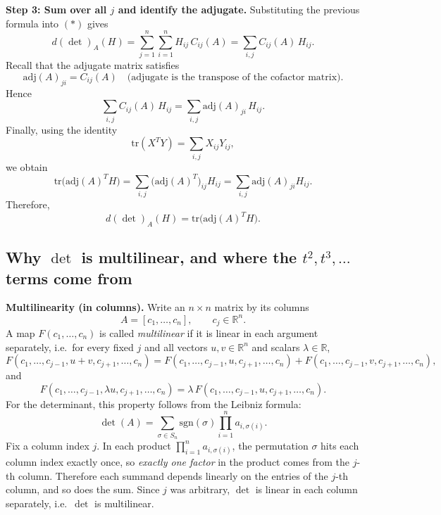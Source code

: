 \documentclass[12pt,a4paper]{article}
\theoremstyle{plain}
\theoremstyle{definition}      %
\begin{document}
	\medskip
	\noindent\textbf{Step 3: Sum over all $j$ and identify the adjugate.}
	Substituting the previous formula into $(\ast)$ gives
	\[
	d(\det)_A(H)=\sum_{j=1}^n\sum_{i=1}^n H_{ij}\,C_{ij}(A)
	=\sum_{i,j} C_{ij}(A)\,H_{ij}.
	\]
	Recall that the adjugate matrix satisfies
	\[
	\mathrm{adj}(A)_{ji}=C_{ij}(A)
	\quad\text{(adjugate is the transpose of the cofactor matrix).}
	\]
	Hence
	\[
	\sum_{i,j} C_{ij}(A)\,H_{ij}
	=\sum_{i,j} \mathrm{adj}(A)_{ji}\,H_{ij}.
	\]
	Finally, using the identity
	\[
	\mathrm{tr}(X^T Y)=\sum_{i,j} X_{ij}Y_{ij},
	\]
	we obtain
	\[
	\mathrm{tr}\big(\mathrm{adj}(A)^T H\big)
	=\sum_{i,j} \big(\mathrm{adj}(A)^T\big)_{ij}H_{ij}
	=\sum_{i,j} \mathrm{adj}(A)_{ji}H_{ij}.
	\]
	Therefore,
	\[
	d(\det)_A(H)=\mathrm{tr}\big(\mathrm{adj}(A)^T H\big).
	\]
	
	\subsection*{Why $\det$ is multilinear, and where the $t^2,t^3,\dots$ terms come from}
	
	\noindent\textbf{Multilinearity (in columns).}
	Write an $n\times n$ matrix by its columns
	\[
	A=[c_1,\dots,c_n],\qquad c_j\in\mathbb{R}^n.
	\]
	A map $F(c_1,\dots,c_n)$ is called \emph{multilinear} if it is linear in each argument separately, i.e.\ for every
	fixed $j$ and all vectors $u,v\in\mathbb{R}^n$ and scalars $\lambda\in\mathbb{R}$,
	\[
	F(c_1,\dots,c_{j-1},u+v,c_{j+1},\dots,c_n)
	=
	F(c_1,\dots,c_{j-1},u,c_{j+1},\dots,c_n)
	+
	F(c_1,\dots,c_{j-1},v,c_{j+1},\dots,c_n),
	\]
	and
	\[
	F(c_1,\dots,c_{j-1},\lambda u,c_{j+1},\dots,c_n)
	=
	\lambda\,F(c_1,\dots,c_{j-1},u,c_{j+1},\dots,c_n).
	\]
	For the determinant, this property follows from the Leibniz formula:
	\[
	\det(A)=\sum_{\sigma\in S_n}\mathrm{sgn}(\sigma)\prod_{i=1}^n a_{i,\sigma(i)}.
	\]
	Fix a column index $j$. In each product $\prod_{i=1}^n a_{i,\sigma(i)}$, the permutation $\sigma$ hits each column
	index exactly once, so \emph{exactly one factor} in the product comes from the $j$-th column. Therefore each summand
	depends linearly on the entries of the $j$-th column, and so does the sum. Since $j$ was arbitrary, $\det$ is linear
	in each column separately, i.e.\ $\det$ is multilinear.
	
\end{document}
